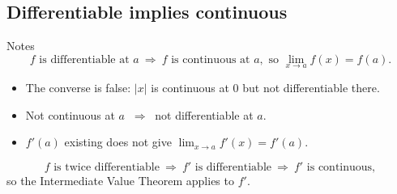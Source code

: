 \documentclass[11pt,a4paper]{article}
\newcommand{\imp}{\ \Longrightarrow\ }
\begin{document}
\subsection{Differentiable implies continuous}
\begin{notesbox}{Notes}
\[
f \text{ is differentiable at } a \imp f \text{ is continuous at } a, \text{ so } \lim_{x\to a}f(x)=f(a).
\]
\begin{itemize}
 \item The converse is false: $|x|$ is continuous at $0$ but not differentiable there.
 \item Not continuous at $a$ $\imp$ not differentiable at $a$.
 \item $f'(a)$ existing does not give $\displaystyle\lim_{x\to a}f'(x)=f'(a)$.
\end{itemize}
\[
f \text{ is twice differentiable} \imp f' \text{ is differentiable} \imp f' \text{ is continuous},
\]
so the Intermediate Value Theorem applies to $f'$.
\end{notesbox}
\end{document}

